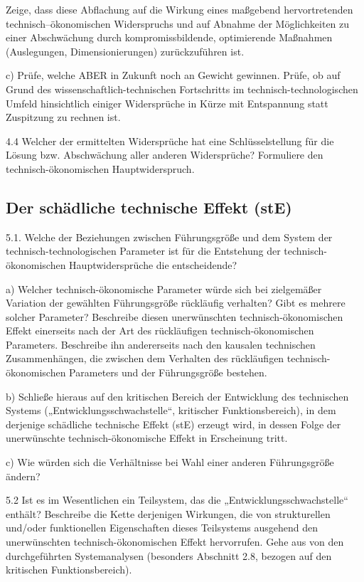 \documentclass[12pt,a4paper]{article}
\begin{document}
Zeige, dass diese Abflachung auf die Wirkung eines maßgebend hervortretenden
technisch–ökonomischen Widerspruchs und auf Abnahme der Möglichkeiten zu einer
Abschwächung durch kompromissbildende, optimierende Maßnahmen (Auslegungen,
Dimensionierungen) zurückzuführen ist.

c) Prüfe, welche ABER in Zukunft noch an Gewicht gewinnen. Prüfe, ob auf Grund
des wissenschaftlich-technischen Fortschritts im technisch-technologischen
Umfeld hinsichtlich einiger Widersprüche in Kürze mit Entspannung statt
Zuspitzung zu rechnen ist.

4.4 Welcher der ermittelten Widersprüche hat eine Schlüsselstellung für die
Lösung bzw. Abschwächung aller anderen Widersprüche? Formuliere den
technisch-ökonomischen Hauptwiderspruch.

\subsection{Der schädliche technische Effekt (stE)}

5.1. Welche der Beziehungen zwischen Führungsgröße und dem System der
technisch-technologischen Parameter ist für die Entstehung der
technisch-ökonomischen Hauptwidersprüche die entscheidende?

a) Welcher technisch-ökonomische Parameter würde sich bei zielgemäßer Variation
der gewählten Führungsgröße rückläufig verhalten? Gibt es mehrere solcher
Parameter? Beschreibe diesen unerwünschten technisch-ökonomischen Effekt
einerseits nach der Art des rückläufigen technisch-ökonomischen Parameters.
Beschreibe ihn andererseits nach den kausalen technischen Zusammenhängen, die
zwischen dem Verhalten des rückläufigen technisch-ökonomischen Parameters und
der Führungsgröße bestehen.

b) Schließe hieraus auf den kritischen Bereich der Entwicklung des technischen
Systems („Entwicklungsschwachstelle“, kritischer Funktionsbereich), in dem
derjenige schädliche technische Effekt (stE) erzeugt wird, in dessen Folge der
unerwünschte technisch-ökonomische Effekt in Erscheinung tritt.

c) Wie würden sich die Verhältnisse bei Wahl einer anderen Führungsgröße
ändern?

5.2 Ist es im Wesentlichen ein Teilsystem, das die „Entwicklungsschwachstelle“
enthält?  Beschreibe die Kette derjenigen Wirkungen, die von strukturellen
und/oder funktionellen Eigenschaften dieses Teilsystems ausgehend den
unerwünschten technisch-ökonomischen Effekt hervorrufen. Gehe aus von den
durchgeführten Systemanalysen (besonders Abschnitt 2.8, bezogen auf den
kritischen Funktionsbereich).
\end{document}
